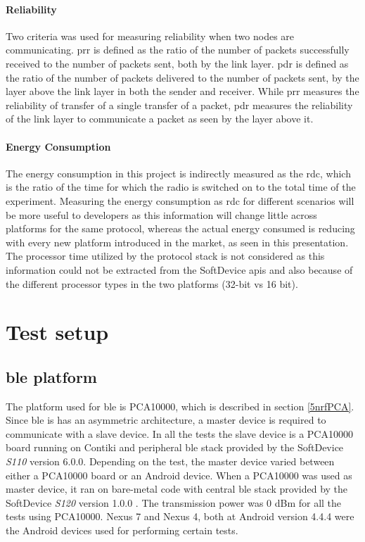 \paragraph{Reliability}
Two criteria was used for measuring reliability when two nodes are communicating. \gls{prr} is defined as the ratio of the number of packets successfully received to the number of packets sent, both by the link layer. \gls{pdr} is defined as the ratio of the number of packets delivered to the number of packets sent, by the layer above the link layer in both the sender and receiver. While \gls{prr} measures the reliability of transfer of a single transfer of a packet, \gls{pdr} measures the reliability of the link layer to communicate a packet as seen by the layer above it.

\paragraph{Energy Consumption}
The energy consumption in this project is indirectly measured as the \acrfull{rdc}, which is the ratio of the time for which the radio is switched on to the total time of the experiment. Measuring the energy consumption as \gls{rdc} for different scenarios will be more useful to developers as this information will change little across platforms for the same protocol, whereas the actual energy consumed is reducing with every new platform introduced in the market, as seen in this presentation\cite{Bernegger2014}. The processor time utilized by the protocol stack is not considered as this information could not be extracted from the SoftDevice \glspl{api} and also because of the different processor types in the two platforms (32-bit vs 16 bit). 


\section{Test setup} \label{6TestPlatforms}

\subsection{\gls{ble} platform}
The platform used for \gls{ble} is PCA10000, which is described in section \ref{5nrfPCA}. Since \gls{ble}  is has an asymmetric architecture, a master device is required to communicate with a slave device. In all the tests the slave device is a PCA10000 board running on Contiki and peripheral \gls{ble}  stack provided by the SoftDevice \emph{S110} version 6.0.0. Depending on the test, the master device varied between either a PCA10000 board or an Android device. When a PCA10000 was used as master device, it ran on bare-metal code with central \gls{ble} stack provided by the SoftDevice \emph{S120} version 1.0.0 . The transmission power was 0 dBm for all the tests using PCA10000. Nexus 7 and Nexus 4, both at Android version 4.4.4 were the Android devices used for performing certain tests.

